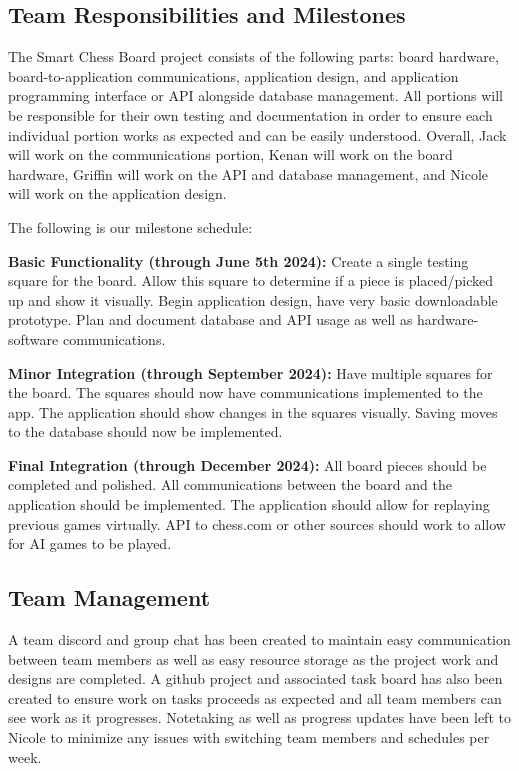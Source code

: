 \documentclass[11pt,journal]{IEEEtran}
\begin{document}
\subsection{Team Responsibilities and Milestones}
The Smart Chess Board project consists of the following parts: board hardware, board-to-application communications, application design, and application programming interface or API alongside database management. All portions will be responsible for their own testing and documentation in order to ensure each individual portion works as expected and can be easily understood. Overall, Jack will work on the communications portion, Kenan will work on the board hardware, Griffin will work on the API and database management, and Nicole will work on the application design.

The following is our milestone schedule:


\textbf{Basic Functionality (through June 5th 2024):} Create a single testing square for the board. Allow this square to determine if a piece is placed/picked up and show it visually. Begin application design, have very basic downloadable prototype. Plan and document database and API usage as well as hardware-software communications.

\textbf{Minor Integration (through September 2024):} Have multiple squares for the board. The squares should now have communications implemented to the app. The application should show changes in the squares visually. Saving moves to the database should now be implemented.

\textbf{Final Integration (through December 2024):} All board pieces should be completed and polished. All communications between the board and the application should be implemented. The application should allow for replaying previous games virtually. API to chess.com or other sources should work to allow for AI games to be played. 



\subsection{Team Management}

A team discord and group chat has been created to maintain easy communication between team members as well as easy resource storage as the project work and designs are completed. A github project and associated task board has also been created to ensure work on tasks proceeds as expected and all team members can see work as it progresses. Notetaking as well as progress updates have been left to Nicole to minimize any issues with switching team members and schedules per week.
\end{document}

